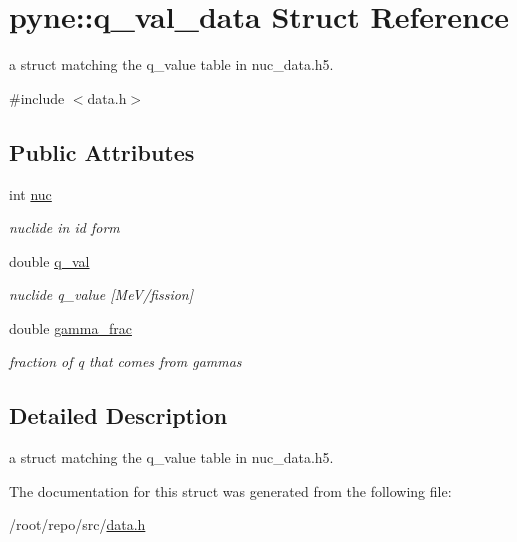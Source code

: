 \hypertarget{structpyne_1_1q__val__data}{}\section{pyne\+:\+:q\+\_\+val\+\_\+data Struct Reference}
\label{structpyne_1_1q__val__data}


a struct matching the q\+\_\+value table in nuc\+\_\+data.\+h5.  




{\ttfamily \#include $<$data.\+h$>$}

\subsection*{Public Attributes}
\begin{DoxyCompactItemize}
\item 
\mbox{\label{structpyne_1_1q__val__data_a39dbf1ad0347f0f68f09c94a9ff9157f}} 
int \hyperlink{structpyne_1_1q__val__data_a39dbf1ad0347f0f68f09c94a9ff9157f}{nuc}
\begin{DoxyCompactList}\small\item\em nuclide in id form \end{DoxyCompactList}\item 
\mbox{\label{structpyne_1_1q__val__data_a8016ec428535fddb8cba5005511d4a8a}} 
double \hyperlink{structpyne_1_1q__val__data_a8016ec428535fddb8cba5005511d4a8a}{q\+\_\+val}
\begin{DoxyCompactList}\small\item\em nuclide q\+\_\+value \mbox{[}Me\+V/fission\mbox{]} \end{DoxyCompactList}\item 
\mbox{\label{structpyne_1_1q__val__data_a5d47c172a924715d567a1b6119e20830}} 
double \hyperlink{structpyne_1_1q__val__data_a5d47c172a924715d567a1b6119e20830}{gamma\+\_\+frac}
\begin{DoxyCompactList}\small\item\em fraction of q that comes from gammas \end{DoxyCompactList}\end{DoxyCompactItemize}


\subsection{Detailed Description}
a struct matching the q\+\_\+value table in nuc\+\_\+data.\+h5. 

The documentation for this struct was generated from the following file\+:\begin{DoxyCompactItemize}
\item 
/root/repo/src/\hyperlink{data_8h}{data.\+h}\end{DoxyCompactItemize}
